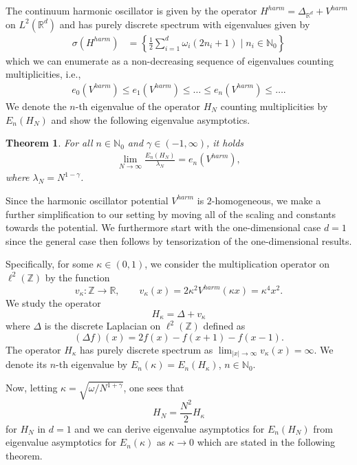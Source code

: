 \documentclass[12pt, reqno]{amsart}
\newtheorem{theorem}{Theorem}[section]
\theoremstyle{definition}
\numberwithin{equation}{section}
\newcommand{\Z}{{\mathbb Z}}
\newcommand{\R}{{\mathbb R}}
\newcommand{\N}{{\mathbb N}}
\begin{document}
The continuum harmonic oscillator is given by the operator $H^{harm}=\Delta_{\R^d}+V^{harm}$ on $L^2(\R^d)$ and has purely discrete spectrum with eigenvalues given by 
\begin{align*}
   \sigma(H^{harm})&= \left\{\frac12\sum_{i=1}^d \omega_i(2n_i+1) \mid n_i\in \N_0\right\}
\end{align*}
which we can enumerate as a non-decreasing sequence of eigenvalues counting multiplicities, i.e.,
\begin{align*}
   e_0(V^{harm})\leq e_1(V^{harm})\leq\ldots\leq e_n(V^{harm}){\leq}\ldots.
\end{align*}
We denote the $n$-th eigenvalue of the operator $H_N$ counting multiplicities by $E_n(H_N)$ and show the following eigenvalue asymptotics.
\begin{theorem}\label{thm:eigenvalue_asymptotics_harmonic_oscillator_main}
    For all $n\in \mathbb{N}_0$ and $\gamma\in (-1,\infty)$, it holds
    \begin{align*}
        \lim_{N\to \infty} \frac{E_n(H_N)}{\lambda_N} = e_n(V^{harm}),
    \end{align*}
    where $\lambda_N=N^{1-\gamma}$.
\end{theorem}


Since the harmonic oscillator potential $V^{harm}$ is $2$-homogeneous, we make a further simplification to our setting by moving all of the scaling and constants towards the potential. We furthermore start with the one-dimensional case $d=1$ since the general case then follows by tensorization of the one-dimensional results.

Specifically, for some $\kappa\in (0,1)$, we consider the multiplication operator on $\ell^2(\Z)$ by the function $$v_\kappa:\Z\to \R,\qquad v_\kappa(x)=2\kappa^2V^{harm}(\kappa x)=\kappa^4 x^2.$$ We study the operator 
$$H_\kappa=\Delta + v_\kappa$$
where $\Delta$ is the discrete Laplacian on $\ell^2(\Z)$ defined as
$$(\Delta f)(x)=2f(x)-f(x+1)-f(x-1).$$
The operator $H_\kappa$ has purely discrete spectrum as $\lim_{|x|\to\infty} v_\kappa(x)=\infty$. We denote its $n$-th eigenvalue by $E_n(\kappa)=E_n(H_\kappa)$, $n\in \N_0$.

Now, letting $\kappa=\sqrt{\omega/N^{1+\gamma}}$, one sees that
$$H_N = \frac{N^2}{2}H_\kappa $$ 
for $H_N$ in  $d=1$ and we can derive eigenvalue asymptotics for $E_n(H_N)$ from eigenvalue asymptotics for $E_n(\kappa)$ as $\kappa\to 0$ which are stated in the following theorem.
\end{document}
